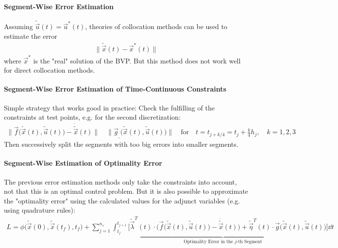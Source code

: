 				\paragraph{Segment-Wise Error Estimation}
					Assuming \( \tilde{\vec{u}}(t) = \vec{u}^\ast(t) \), theories of collocation methods can be used to estimate the error
					\begin{align*}
						\big\lVert \tilde{\vec{x}}(t) - \vec{x}^\ast(t) \big\rVert
					\end{align*}
					where \( \vec{x}^\ast \) is the "real" solution of the BVP. But this method does not work well for direct collocation methods.

				\paragraph{Segment-Wise Error Estimation of Time-Continuous Constraints}
					Simple strategy that works good in practice: Check the fulfilling of the constraints at test points, e.g. for the second discretization:
					\begin{align*}
						\big\lVert \vec{f}\big( \tilde{\vec{x}}(t), \tilde{\vec{u}}(t) \big) - \dot{\tilde{\vec{x}}}(t) \big\rVert \quad \big\lVert \vec{g}_{\_}\big(\tilde{\vec{x}}(t), \tilde{\vec{u}}(t)\big) \big\rVert \quad\text{for}\quad t = t_{j + k/4} = t_j + \frac{k}{4} h_j,\quad k = 1, 2, 3
					\end{align*}
					Then successively split the segments with too big errors into smaller segments.

				\paragraph{Segment-Wise Estimation of Optimality Error}
					The previous error estimation methods only take the constraints into account, not that this is an optimal control problem. But it is also possible to approximate the "optimality error" using the calculated values for the adjunct variables (e.g. using quadrature rules):
					\begin{align*}
						L = \phi\big( \tilde{\vec{x}}(0), \tilde{\vec{x}}(t_f), t_f \big) + \sum_{j = 1}^{n_s} \underbrace{\int_{t_j}^{t_{j + 1}} \! \Big[ \tilde{\vec{\lambda}}^T\!(t) \cdot \Big(\! \vec{f}\big( \tilde{\vec{x}}(t), \tilde{\vec{u}}(t) \big) - \dot{\tilde{\vec{x}}}(t) \!\Big) + \tilde{\vec{\eta}}^T\!(t) \cdot \vec{g}\big( \tilde{\vec{x}}(t), \tilde{\vec{u}}(t) \big) \Big] \dd{t}}_\text{Optimality Error in the \(j\)-th Segment}
					\end{align*}

